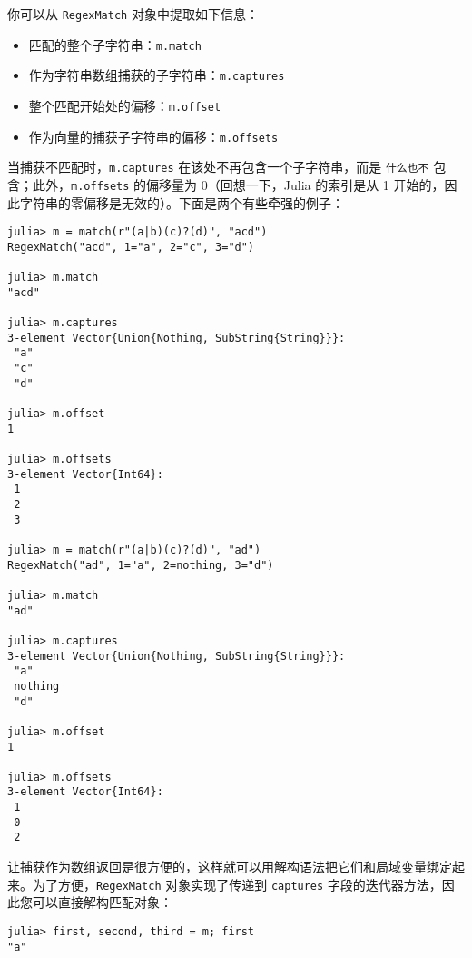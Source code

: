 你可以从 \texttt{RegexMatch} 对象中提取如下信息：



\begin{itemize}
\item 匹配的整个子字符串：\texttt{m.match}


\item 作为字符串数组捕获的子字符串：\texttt{m.captures}


\item 整个匹配开始处的偏移：\texttt{m.offset}


\item 作为向量的捕获子字符串的偏移：\texttt{m.offsets}

\end{itemize}


当捕获不匹配时，\texttt{m.captures} 在该处不再包含一个子字符串，而是 \texttt{什么也不} 包含；此外，\texttt{m.offsets} 的偏移量为 0（回想一下，Julia 的索引是从 1 开始的，因此字符串的零偏移是无效的）。下面是两个有些牵强的例子：




\begin{verbatim}
julia> m = match(r"(a|b)(c)?(d)", "acd")
RegexMatch("acd", 1="a", 2="c", 3="d")

julia> m.match
"acd"

julia> m.captures
3-element Vector{Union{Nothing, SubString{String}}}:
 "a"
 "c"
 "d"

julia> m.offset
1

julia> m.offsets
3-element Vector{Int64}:
 1
 2
 3

julia> m = match(r"(a|b)(c)?(d)", "ad")
RegexMatch("ad", 1="a", 2=nothing, 3="d")

julia> m.match
"ad"

julia> m.captures
3-element Vector{Union{Nothing, SubString{String}}}:
 "a"
 nothing
 "d"

julia> m.offset
1

julia> m.offsets
3-element Vector{Int64}:
 1
 0
 2
\end{verbatim}



让捕获作为数组返回是很方便的，这样就可以用解构语法把它们和局域变量绑定起来。为了方便，\texttt{RegexMatch} 对象实现了传递到 \texttt{captures} 字段的迭代器方法，因此您可以直接解构匹配对象：




\begin{verbatim}
julia> first, second, third = m; first
"a"
\end{verbatim}



